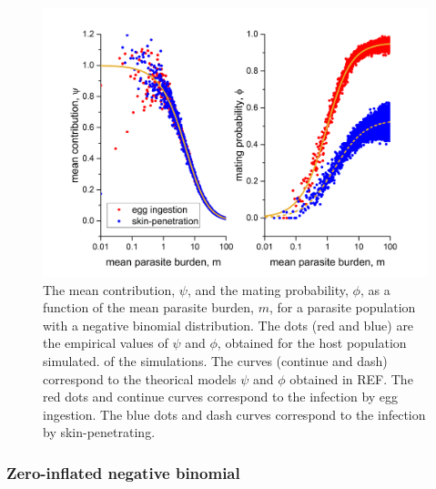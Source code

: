 \documentclass[12pt,a4paper]{article}
\theoremstyle{plain}%
\theoremstyle{definition}
\theoremstyle{remark}
\begin{document}
\begin{figure}[h!]
	\centering 	\includegraphics[width=0.9\linewidth]{nb}
	\caption{The mean contribution, $\psi$, and the mating probability, $\phi$, as a function of the mean parasite burden, $m$, for a parasite population with a negative binomial distribution. 
		The dots (red and blue) are the empirical values of $\psi$ and $\phi$, obtained for the host population simulated.
		of the simulations. 
		The curves (continue and dash) correspond to the theorical models $\psi$ and $\phi$ obtained in REF.
		The red dots and continue curves correspond to the infection by egg ingestion. 
		The blue dots and dash curves correspond to the infection by skin-penetrating. 
	} 
	\label{f:nb}
\end{figure}


\newpage
\subsubsection{Zero-inflated negative binomial}
\end{document}
